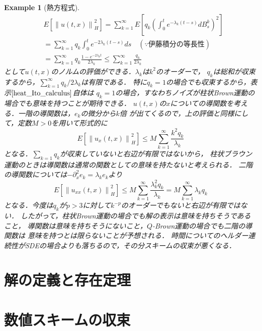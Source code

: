 \documentclass[dvipdfmx,autodetect-engine]{jsarticle}
\newtheorem{example}{Example}[section]
\theoremstyle{remark}
\theoremstyle{definition}
\newcommand{\norm}[1]{\left\lVert#1\right\rVert}
\newcommand{\paren}[1]{\left( #1 \right)}
\begin{document}
\begin{example}[熱方程式]
\begin{align}
        &E[\norm{u(t,x)}_{H}^{2}] = \sum_{k=1}^{\infty} E\left[
            q_{k} \paren{
                \int_{0}^{t} e^{-\lambda_{k}(t-s)} dB_{s}^{k}
            }^{2}
        \right]\\
        &= \sum_{k=1}^{\infty} q_{k} \int_{0}^{t} e^{-2\lambda_{k}(t-s)}ds
        \quad (\because \text{伊藤積分の等長性})\\
        &= \sum_{k=1}^{\infty} q_{k} \frac{1 - e^{-2\lambda_{k}t}}{2\lambda_{k}}
        \leq \sum_{k=1}^{\infty}  \frac{q_{k}}{2\lambda_{k}}
    \end{align}
    として$u(t,x)$のノルムの評価ができる．$\lambda_{k}$は$k^2$のオーダーで，
    $q_{k}$は総和が収束するから，$\sum_{k=1}^{\infty}  q_{k} / 2\lambda_{k}$は有限である．
    特に$q_{k}=1$の場合でも収束するから，表示$\eqref{heat_Ito_calculus}$自体は
    $q_{k}=1$の場合，すなわちノイズが柱状Brown運動の場合でも意味を持つことが期待できる．
    $u(t,x)$の$x$についての導関数を考える．一階の導関数は，$e_{k}$の微分から$k$倍
    が出てくるので，上の評価と同様にして，定数$M>0$を用いて形式的に
    \begin{equation}
        E[\norm{u_{x}(t,x)}_{H}^{2}] \leq M \sum_{k=1}^{\infty} \frac{k^{2}q_{k}}{\lambda_{k}}
    \end{equation}
    となる．$\sum_{k=1}q_{k}$が収束していないと右辺が有限ではないから，
    柱状ブラウン運動のときは導関数は通常の関数としての意味を持たないと考えられる．
    二階の導関数については$-\partial_{x}^{2} e_{k} = \lambda_{k} e_{k}$より
    \begin{equation}
        E[\norm{u_{xx}(t,x)}_{H}^{2}] \leq
         M \sum_{k=1}^{\infty} \frac{\lambda_{k}^{2}q_{k}}{\lambda_{k}}
         = M\sum_{k=1}^{\infty} \lambda_{k} q_{k}
    \end{equation}
    となる．今度は$q_{k}$が$p>3$に対して$k^{-p}$のオーダーでもないと右辺が有限ではない．
    したがって，柱状Brown運動の場合でも解の表示は意味を持ちそうであること，
    導関数は意味を持ちそうにないこと，$Q$-Brown運動の場合でも二階の導関数は
    意味を持つとは限らないことが予想される．
    時間についてのヘルダー連続性がSDEの場合よりも落ちるので，その分スキームの収束が悪くなる．
\end{example}

\section{解の定義と存在定理}

\section{数値スキームの収束}
\end{document}
